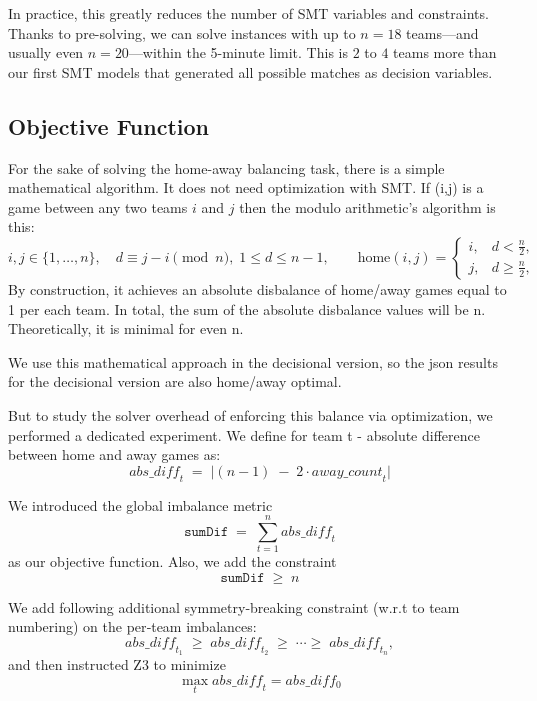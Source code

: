 \documentclass{article}
\begin{document}

In practice, this greatly reduces the number of SMT variables and constraints. Thanks to pre-solving, we can solve instances with up to $n=18$ teams—and usually even $n=20$—within the 5-minute limit. This is $2$ to $4$ teams more than our first SMT models that generated all possible matches as decision variables.

\subsection{Objective Function}

For the sake of solving the home-away balancing task, there is a simple mathematical algorithm. It does not need optimization with SMT.
If (i,j) is a game between any two teams $i$ and $j$ then the modulo arithmetic's algorithm is this:
\[
i,j\in\{1,\dots,n\},\quad
d\equiv j-i\pmod n,\;1\le d\le n-1,
\qquad
\text{home}(i,j)=
\begin{cases}
i,&d<\tfrac n2,\\
j,&d\ge\tfrac n2,
\end{cases}
\]
By construction, it achieves an absolute disbalance of home/away games equal to 1 per each team. In total, the sum of the absolute disbalance values will be n.
Theoretically, it is minimal for even n.

We use this mathematical approach in the decisional version, so the json results for the decisional version are also home/away optimal.

But to study the solver overhead of enforcing this balance via optimization, we performed a dedicated experiment. 
We define for team t - absolute difference between home and away games as:
\[
\mathit{abs\_diff}_t \;=\;\bigl\lvert (n-1)\;-\;2\cdot\mathit{away\_count}_t\bigr\rvert
\]

 We introduced the global imbalance metric
\[
\texttt{sumDif} \;=\;\sum_{t=1}^{n}\mathit{abs\_diff}_t
\]
as our objective function.  Also, we add the constraint
\[
\texttt{sumDif} \;\ge\; n
\]

We add following additional symmetry‑breaking constraint (w.r.t to team numbering) on the per‑team imbalances:
\[
\mathit{abs\_diff}_{t_1}\;\ge\;\mathit{abs\_diff}_{t_2}\;\ge\;\cdots\ge\;\mathit{abs\_diff}_{t_n},
\]
and then instructed Z3 to minimize
\[
\max_{t}\mathit{abs\_diff}_t = abs\_diff_{0}
\]
\end{document}
